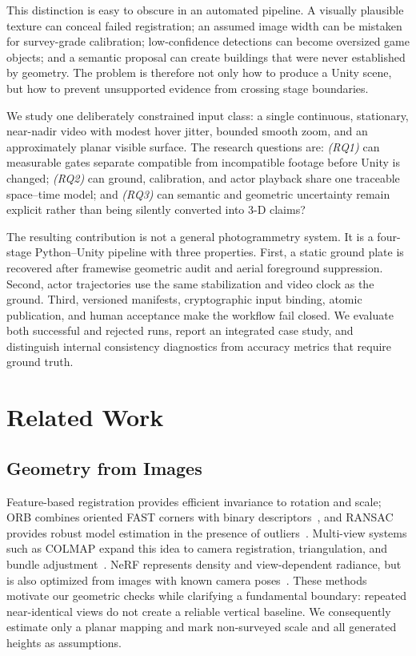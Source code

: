 \documentclass[letterpaper,conference]{IEEEtran}
\begin{document}
This distinction is easy to obscure in an automated pipeline. A visually plausible texture can conceal failed registration; an assumed image width can be mistaken for survey-grade calibration; low-confidence detections can become oversized game objects; and a semantic proposal can create buildings that were never established by geometry. The problem is therefore not only how to produce a Unity scene, but how to prevent unsupported evidence from crossing stage boundaries.

We study one deliberately constrained input class: a single continuous, stationary, near-nadir video with modest hover jitter, bounded smooth zoom, and an approximately planar visible surface. The research questions are: \emph{(RQ1)} can measurable gates separate compatible from incompatible footage before Unity is changed; \emph{(RQ2)} can ground, calibration, and actor playback share one traceable space--time model; and \emph{(RQ3)} can semantic and geometric uncertainty remain explicit rather than being silently converted into 3-D claims?

The resulting contribution is not a general photogrammetry system. It is a four-stage Python--Unity pipeline with three properties. First, a static ground plate is recovered after framewise geometric audit and aerial foreground suppression. Second, actor trajectories use the same stabilization and video clock as the ground. Third, versioned manifests, cryptographic input binding, atomic publication, and human acceptance make the workflow fail closed. We evaluate both successful and rejected runs, report an integrated case study, and distinguish internal consistency diagnostics from accuracy metrics that require ground truth.

\section{Related Work}
\subsection{Geometry from Images}
Feature-based registration provides efficient invariance to rotation and scale; ORB combines oriented FAST corners with binary descriptors~\cite{rublee2011orb}, and RANSAC provides robust model estimation in the presence of outliers~\cite{fischler1981ransac}. Multi-view systems such as COLMAP expand this idea to camera registration, triangulation, and bundle adjustment~\cite{schonberger2016sfm}. NeRF represents density and view-dependent radiance, but is also optimized from images with known camera poses~\cite{mildenhall2020nerf}. These methods motivate our geometric checks while clarifying a fundamental boundary: repeated near-identical views do not create a reliable vertical baseline. We consequently estimate only a planar mapping and mark non-surveyed scale and all generated heights as assumptions.
\end{document}
